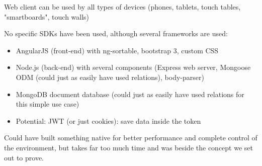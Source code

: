 Web client can be used by all types of devices (phones, tablets, touch tables, "smartboards", touch walls)

No specific SDKs have been used, although several frameworks are used:
\begin{itemize}
  \item AngularJS (front-end) with ng-sortable, bootstrap 3, custom CSS
  \item Node.js (back-end) with several components (Express web server, Mongoose ODM (could just as easily have used relations), body-parser)
  \item MongoDB document database (could just as easily have used relations for this simple use case)
  \item Potential: JWT (or just cookies): save data inside the token
\end{itemize}

Could have built something native for better performance and complete control of the environment, but takes far too much time and was beside the concept we set out to prove.
